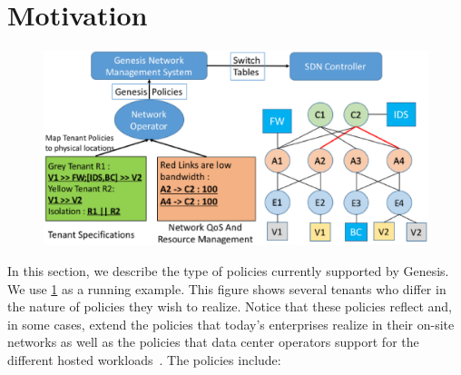 \section{Motivation}
\begin{figure}
	\includegraphics[width=\columnwidth,center]{figures/architecture.eps}
	\label{fig:architecture}
\end{figure}
In this section, we describe the type of policies currently supported by
Genesis. %
We use \cref{fig:architecture} as a running example. This figure shows several
tenants who differ in the nature of policies they wish to realize. 
Notice that these policies reflect and, in some cases, extend the
policies that today's enterprises realize in their on-site networks as
well as the policies that data center operators support for the different hosted
workloads~\cite{mpa-imc15}.  The policies include:





